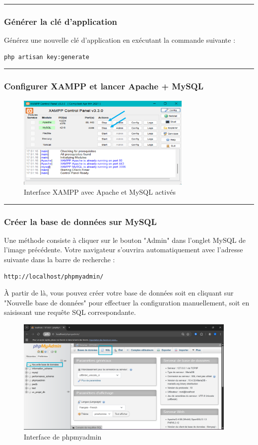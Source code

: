 \documentclass[12pt]{article}
\begin{document}
\rule{\linewidth}{0.2pt}
    \subsubsection{Générer la clé d'application}

Générez une nouvelle clé d'application en exécutant la commande suivante :
        \begin{lstlisting}
php artisan key:generate
        \end{lstlisting}
\rule{\linewidth}{0.2pt}

    \subsubsection{Configurer XAMPP et lancer Apache + MySQL}
        \begin{figure}[h!] 
            \centering 
            \includegraphics[width=0.75\textwidth]{./img/xampp.png} 
            \caption{Interface XAMPP avec Apache et MySQL activés}
        \end{figure}
\rule{\linewidth}{0.2pt}
    \subsubsection{Créer la base de données sur MySQL}
Une méthode consiste à cliquer sur le bouton "Admin" dans l'onglet MySQL de l’image précédente. Votre navigateur s’ouvrira
automatiquement avec l’adresse suivante dans la barre de recherche :
        \begin{lstlisting}
http://localhost/phpmyadmin/
        \end{lstlisting}
À partir de là, vous pouvez créer votre base de données soit en cliquant sur "Nouvelle base de données" pour effectuer la 
configuration manuellement, soit en saisissant une requête SQL correspondante.
        \begin{figure}[h!] 
            \centering 
            \includegraphics[width=0.95\textwidth]{./img/bd.png} 
            \caption{Interface de phpmyadmin}
        \end{figure}
\end{document}
